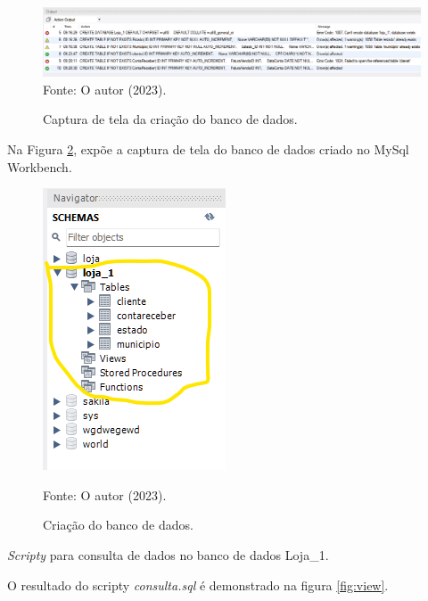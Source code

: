  \begin{figure}[h!]

 \caption{Captura de tela da criação do banco de dados.}
 \includegraphics[width=\textwidth]{figure/fragmento.png}
 \label{fig:fragmento}
 {\fontsize{10pt}{\baselineskip}\selectfont
 Fonte: O autor (2023).}
 \end{figure}
\par Na Figura \ref{fig:banco}, expõe a captura de tela do banco de dados criado no MySql Workbench.
\newpage
 \begin{figure}[h!]
 \caption{Criação do banco de dados.}
 \begin{center}
    \includegraphics[scale=1]{figure/banco.png}
 \end{center}
 \label{fig:banco}
 {\fontsize{10pt}{\baselineskip}\selectfont
 Fonte: O autor (2023).}
 \end{figure}



\par \textit{Scripty} para consulta de dados no banco de dados Loja\_1.



\par O resultado do scripty \textit{consulta.sql} é demonstrado na figura \ref{fig:view}.

